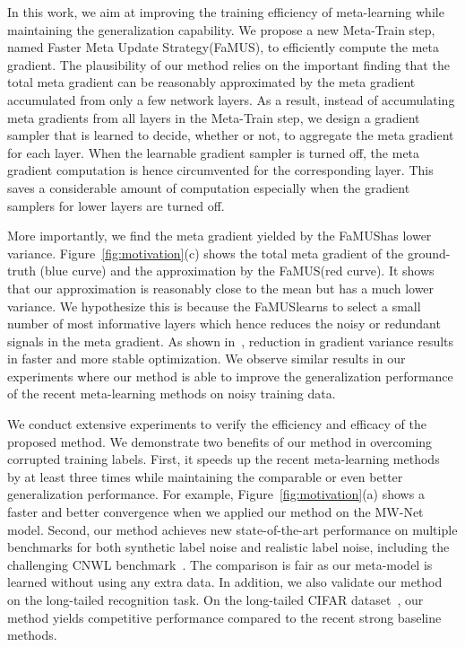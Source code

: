 \documentclass[final]{cvpr}
\newcommand{\methodname}{Faster Meta Update Strategy}
\newcommand{\methodnameabbre}{FaMUS}
\begin{document}
In this work, we aim at improving the training efficiency of meta-learning while maintaining the generalization capability. We propose a new Meta-Train step, named \methodname\space (\methodnameabbre), to efficiently compute the meta gradient. The plausibility of our method relies on the important finding that the total meta gradient can be reasonably approximated by the meta gradient accumulated from only a few network layers. As a result, instead of accumulating meta gradients from all layers in the Meta-Train step, we design a gradient sampler that is learned to decide, whether or not, to aggregate the meta gradient for each layer. 
When the learnable gradient sampler is turned off, the meta gradient computation is hence circumvented for the corresponding layer. This saves a considerable amount of computation especially when the gradient samplers for lower layers are turned off. 


More importantly, we find the meta gradient yielded by the \methodnameabbre\space has lower variance. Figure~\ref{fig:motivation}(c) shows the total meta gradient of the ground-truth (blue curve) and the approximation by the \methodnameabbre\space (red curve). It shows that our approximation is reasonably close to the mean but has a much lower variance. We hypothesize this is because the \methodnameabbre\space learns to select a small number of most informative layers which hence reduces the noisy or redundant signals in the meta gradient. As shown in~\cite{neelakantan2015adding, miller2017reducing}, reduction in gradient variance results in faster and more stable optimization. We observe similar results in our experiments where our method is able to improve the generalization performance of the recent meta-learning methods on noisy training data. 

We conduct extensive experiments to verify the efficiency and efficacy of the proposed method. We demonstrate two benefits of our method in overcoming corrupted training labels. First, it speeds up the recent meta-learning methods~\cite{ren2018learning, shu2019meta, wang2020training} by at least three times while maintaining the comparable or even better generalization performance. For example, Figure~\ref{fig:motivation}(a) shows a faster and better convergence when we applied our method on the MW-Net model. Second, our method achieves new state-of-the-art performance on multiple benchmarks for both synthetic label noise and realistic label noise, including the challenging CNWL benchmark~\cite{jiang2020beyond}.
The comparison is fair as our meta-model is learned without using any extra data. In addition, we also validate our method on the long-tailed recognition task. On the long-tailed CIFAR dataset~\cite{cui2019class}, our method yields competitive performance compared to the recent strong baseline methods.
\end{document}
